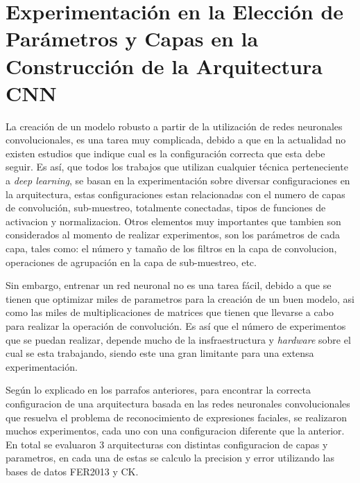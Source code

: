 \section{Experimentación en la Elección de Parámetros y Capas en la Construcción de la Arquitectura CNN}
\label{sec:experiment}
La creación de un modelo robusto a partir de la utilización de redes neuronales convolucionales, es una tarea muy complicada, debido a que en la actualidad no existen estudios que indique cual es la configuración correcta que esta debe seguir. Es así, que todos los trabajos que utilizan cualquier técnica perteneciente a \textit{deep learning}, se basan en la experimentación sobre diversar configuraciones en la arquitectura, estas configuraciones estan relacionadas con el numero de capas de convolución, sub-muestreo, totalmente conectadas, tipos de funciones de activacion y normalizacion. Otros elementos muy importantes que tambien son considerados al momento de realizar experimentos, son los parámetros de cada capa, tales como: el número y tamaño de los filtros en la capa de convolucion, operaciones de agrupación en la capa de sub-muestreo, etc.

Sin embargo, entrenar un red neuronal no es una tarea fácil, debido a que se tienen que optimizar miles de parametros para la creación de un buen modelo, asi como las miles de multiplicaciones de matrices que tienen que llevarse a cabo para realizar la operación de convolución. Es así que el número de experimentos que se puedan realizar, depende mucho de la insfraestructura y \textit{hardware} sobre el cual se esta trabajando, siendo este una gran limitante para una extensa experimentación.

Según lo explicado en los parrafos anteriores, para encontrar la correcta configuracion de una arquitectura basada en las redes neuronales convolucionales que resuelva el problema de reconocimiento de expresiones faciales, se realizaron muchos experimentos, cada uno con una configuracion diferente que la anterior. En total se evaluaron 3 arquitecturas con distintas configuracion de capas y parametros, en cada una de estas se calculo la precision y error utilizando las bases de datos FER2013 y CK.




